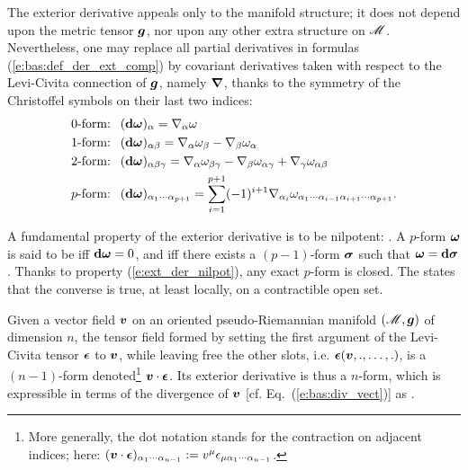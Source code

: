 \begin{remark}
The exterior derivative appeals only to the
manifold structure; it does not depend upon the metric tensor $\bm{g}$, nor upon
any other extra structure on $\mathscr{M}$.
Nevertheless, one may replace
all partial derivatives in formulas (\ref{e:bas:def_der_ext_comp})
by covariant derivatives taken with respect to the Levi-Civita connection
of $\bm{g}$, namely $\bm{\nabla}$,
thanks to the symmetry of the Christoffel symbols on their last two indices:
\begin{subequations}
\begin{align}
    \mbox{0-form: \ } & (\mathbf{d}\bm{\omega})_\alpha =
        \nabla_\alpha \omega \label{e:bas:def_ext_0f_nab} \\
    \mbox{1-form: \ } & (\mathbf{d}\bm{\omega})_{\alpha\beta} =
        \nabla_\alpha \omega_\beta - \nabla_\beta \omega_\alpha
            \label{e:bas:def_ext_1f_nab} \\
    \mbox{2-form: \ } & (\mathbf{d}\bm{\omega})_{\alpha\beta\gamma} =
    \nabla_\alpha\omega_{\beta\gamma} -
    \nabla_\beta\omega_{\alpha\gamma} +
    \nabla_\gamma\omega_{\alpha\beta} \label{e:bas:def_ext_2f_nab} \\
         \mbox{$p$-form: \ }  &
     (\mathbf{d}\bm{\omega})_{\alpha_1\cdots\alpha_{p+1}} =
     \sum_{i=1}^{p+1} (-1)^{i+1} \nabla_{\alpha_i}
     \omega_{\alpha_1\cdots\alpha_{i-1}\alpha_{i+1}\cdots\alpha_{p+1}} .
\end{align}
\end{subequations}
\end{remark}

A fundamental property of the exterior derivative is to be nilpotent:
\be \label{e:ext_der_nilpot}
    .
\ee
A $p$-form $\bm{\omega}$ is said to be  iff $\mathbf{d}\bm{\omega}=0$,
and  iff there exists a $(p-1)$-form $\bm{\sigma}$ such that
$\bm{\omega} = \mathbf{d}\bm{\sigma}$. Thanks to property (\ref{e:ext_der_nilpot}),
any exact $p$-form is closed. The  states that the converse is true,
at least locally, on a contractible open set.

Given a vector field $\bm{v}$ on an oriented pseudo-Riemannian manifold $(\mathscr{M},\bm{g})$ of dimension $n$,
the tensor field formed by setting the first argument of the
Levi-Civita tensor $\bm{\epsilon}$ to $\bm{v}$, while leaving free the other slots, i.e. $\bm{\epsilon}(\bm{v},.,\ldots,.)$,
is a $(n-1)$-form
denoted\footnote{More generally, the dot notation stands for the contraction on adjacent indices; here: $(\bm{v}\cdot\bm{\epsilon})_{\alpha_1\cdots\alpha_{n-1}} := v^\mu \epsilon_{\mu\alpha_1\cdots\alpha_{n-1}}$.}
$\bm{v}\cdot\bm{\epsilon}$. Its exterior
derivative is thus a $n$-form, which is expressible in terms of the divergence
of $\bm{v}$ [cf. Eq.~(\ref{e:bas:div_vect})] as
\be \label{e:bas:dveps_divv}
    .
\ee

